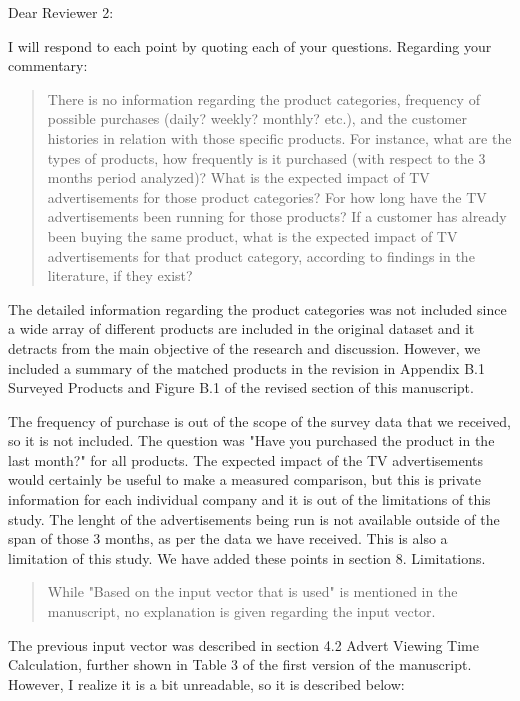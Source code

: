 \documentclass[review]{elsarticle}
\begin{document}
Dear Reviewer 2:

I will respond to each point by quoting each of your questions.
Regarding your commentary: 

\begin{quotation}
There is no information regarding the product categories, frequency of possible purchases (daily? weekly? monthly? etc.), and the customer histories in relation with those specific products. For instance, what are the types of products, how frequently is it purchased (with respect to the 3 months period analyzed)? What is the expected impact of TV advertisements for those product categories? For how long have the TV advertisements been running for those products? If a customer has already been buying the same product, what is the expected impact of TV advertisements for that product category, according to findings in the literature, if they exist?
\end{quotation}

The detailed information regarding the product categories was not included since a wide array of different products are included in the original dataset and it detracts from the main objective of the research and discussion. However, we included a summary of the matched products in the revision in Appendix B.1 Surveyed Products and Figure B.1 of the revised section of this manuscript.

The frequency of purchase is out of the scope of the survey data that we received, so it is not included. The question was "Have you purchased the product in the last month?" for all products. The expected impact of the TV advertisements would certainly be useful to make a measured comparison, but this is private information for each individual company and it is out of the limitations of this study. The lenght of the advertisements being run is not available outside of the span of those 3 months, as per the data we have received. This is also a limitation of this study. We have added these points in section 8. Limitations.

\begin{quotation}
While "Based on the input vector that is used" is mentioned in the manuscript, no explanation is given regarding the input vector.
\end{quotation}

The previous input vector was described in section 4.2 Advert Viewing Time Calculation, further shown in Table 3 of the first version of the manuscript. However, I realize it is a bit unreadable, so it is described below:
\end{document}
